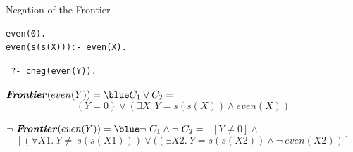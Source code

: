 \documentclass[pdf,slideColor,contemporain]{prosper}
\begin{document}
\begin{slide}{Negation of the Frontier}
\begin{small}
\begin{minipage}{2.5in}
{\blue
 \begin{verbatim}
even(0).
even(s(s(X))):- even(X).

 \end{verbatim}
}
\end{minipage} 
\begin{minipage}{1.5in}
{\blue
 \begin{verbatim}
 ?- cneg(even(Y)).

 \end{verbatim}
}
\end{minipage}
\end{small}

\begin{small}
$\mbox{\bf\emph{Frontier}}(even(Y)) = {\blue C_1 \vee C_2} = $ 
\[ ( Y=0 ) \vee ( \exists X~~ Y=s(s(X)) \wedge even(X) )  \] 

$\neg ~\mbox{\bf \emph{Frontier}}(even(Y)) = {\blue \neg~ C_1 \wedge
\neg~ C_2} = $ $ ~~ [ Y \neq 0 ] \wedge $\[\left[ (\forall X1.~ Y
\neq ~s(s(X1))) \vee ( (\exists X2.~ Y=s(s(X2)) \wedge \neg~ even(X2)
)\right] \]
\end{small}

\end{slide}
\end{document}
